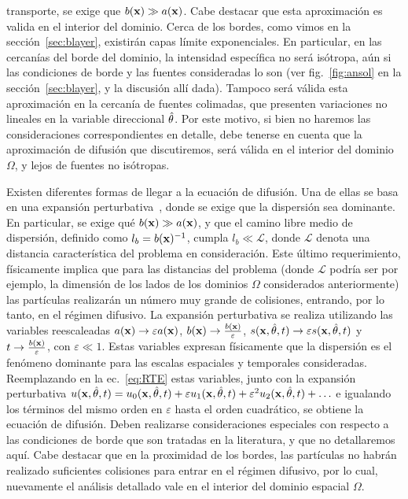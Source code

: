 transporte, se exige que $b(\mathbf{x})\gg a(\mathbf{x})$. Cabe destacar que esta aproximación 
es valida en el interior del dominio. Cerca de los bordes, como vimos en la sección~\ref{sec:blayer}, existirán capas límite exponenciales. 
En particular, en las cercanías del borde del dominio, la intensidad específica no será isótropa, 
aún si las condiciones de borde y las fuentes consideradas lo son (ver fig.~\ref{fig:ansol} 
en la sección~\ref{sec:blayer}, y la discusión allí dada). Tampoco será válida esta 
aproximación en la cercanía de fuentes colimadas, que presenten variaciones no lineales en la variable 
direccional $\hat{\theta}$. Por este motivo, si bien no haremos las consideraciones correspondientes 
en detalle, debe tenerse en cuenta que la aproximación de difusión que discutiremos, 
será válida en el interior del dominio $\Omega$, y lejos de fuentes no isótropas. 

Existen diferentes formas 
de llegar a la ecuación de difusión. Una de ellas se basa en  una expansión perturbativa~\cite{Larsen1974,Larsen1987,Arridge2009}, 
donde se exige que la dispersión sea dominante. En particular, se exige qué $b(\mathbf{x}) \gg a(\mathbf{x})$, 
y que el camino libre medio de dispersión, definido como $l_b=b(\mathbf{x})^{-1}$, cumpla $l_b\ll \mathcal{L}$, 
donde $\mathcal{L}$ denota una distancia característica del problema en consideración. 
Este último requerimiento, físicamente implica que para las distancias del problema (donde $\mathcal{L}$ 
podría ser por ejemplo, la dimensión de los lados de los dominios $\Omega$ considerados anteriormente) las partículas realizarán un número muy grande de colisiones, entrando, por lo tanto, en el régimen difusivo. La expansión perturbativa se realiza utilizando las variables 
reescaleadas $a(\mathbf{x}) \rightarrow \varepsilon a(\mathbf{x})$, $b(\mathbf{x}) \rightarrow \frac{b(\mathbf{x})}{\varepsilon}$, $s(\mathbf{x},\hat{\theta},t)\rightarrow  \varepsilon s(\mathbf{x},\hat{\theta},t)$ y $t\rightarrow \frac{b(\mathbf{x})}{\varepsilon}$, con $\varepsilon \ll 1$. Estas variables  expresan físicamente que la dispersión es el fenómeno dominante para las 
escalas espaciales y temporales consideradas. Reemplazando en la ec.~\eqref{eq:RTE} estas variables, junto con la expansión perturbativa $u(\mathbf{x},\hat{\theta},t)=u_0(\mathbf{x},\hat{\theta},t)+\varepsilon u_1(\mathbf{x},\hat{\theta},t)+\varepsilon^2 u_2(\mathbf{x},\hat{\theta},t)+\ldots$ e igualando los términos del mismo orden en $\varepsilon$ 
hasta el orden cuadrático, se obtiene la ecuación de difusión. Deben realizarse consideraciones especiales con respecto a las condiciones de 
borde que son tratadas en la literatura, y que no detallaremos aquí. Cabe destacar que en la proximidad de los bordes, las partículas no habrán realizado suficientes colisiones para entrar en el régimen difusivo, por lo cual, nuevamente el análisis detallado vale en el interior del dominio espacial $\Omega$. 

